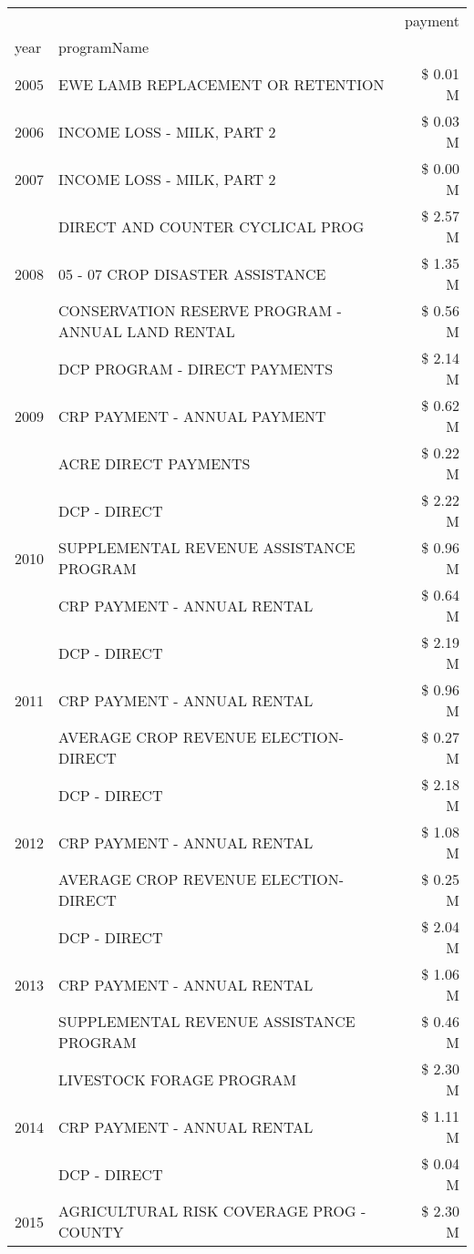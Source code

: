 \begin{tabular}{llr}
\toprule
 &  & payment \\
year & programName &  \\
\midrule
2005 & EWE LAMB REPLACEMENT OR RETENTION & \$ 0.01 M \\
\cline{1-3}
2006 & INCOME LOSS - MILK, PART 2 & \$ 0.03 M \\
\cline{1-3}
2007 & INCOME LOSS - MILK, PART 2 & \$ 0.00 M \\
\cline{1-3}
\multirow[t]{3}{*}{2008} & DIRECT AND COUNTER CYCLICAL PROG & \$ 2.57 M \\
 & 05 - 07 CROP DISASTER ASSISTANCE & \$ 1.35 M \\
 & CONSERVATION RESERVE PROGRAM - ANNUAL LAND RENTAL & \$ 0.56 M \\
\cline{1-3}
\multirow[t]{3}{*}{2009} & DCP PROGRAM - DIRECT PAYMENTS & \$ 2.14 M \\
 & CRP PAYMENT - ANNUAL PAYMENT & \$ 0.62 M \\
 & ACRE DIRECT PAYMENTS & \$ 0.22 M \\
\cline{1-3}
\multirow[t]{3}{*}{2010} & DCP - DIRECT & \$ 2.22 M \\
 & SUPPLEMENTAL REVENUE ASSISTANCE PROGRAM & \$ 0.96 M \\
 & CRP PAYMENT - ANNUAL RENTAL & \$ 0.64 M \\
\cline{1-3}
\multirow[t]{3}{*}{2011} & DCP - DIRECT & \$ 2.19 M \\
 & CRP PAYMENT - ANNUAL RENTAL & \$ 0.96 M \\
 & AVERAGE CROP REVENUE ELECTION-DIRECT & \$ 0.27 M \\
\cline{1-3}
\multirow[t]{3}{*}{2012} & DCP - DIRECT & \$ 2.18 M \\
 & CRP PAYMENT - ANNUAL RENTAL & \$ 1.08 M \\
 & AVERAGE CROP REVENUE ELECTION-DIRECT & \$ 0.25 M \\
\cline{1-3}
\multirow[t]{3}{*}{2013} & DCP - DIRECT & \$ 2.04 M \\
 & CRP PAYMENT - ANNUAL RENTAL & \$ 1.06 M \\
 & SUPPLEMENTAL REVENUE ASSISTANCE PROGRAM & \$ 0.46 M \\
\cline{1-3}
\multirow[t]{3}{*}{2014} & LIVESTOCK FORAGE PROGRAM & \$ 2.30 M \\
 & CRP PAYMENT - ANNUAL RENTAL & \$ 1.11 M \\
 & DCP - DIRECT & \$ 0.04 M \\
\cline{1-3}
\multirow[t]{3}{*}{2015} & AGRICULTURAL RISK COVERAGE PROG - COUNTY & \$ 2.30 M \\

\end{tabular}
